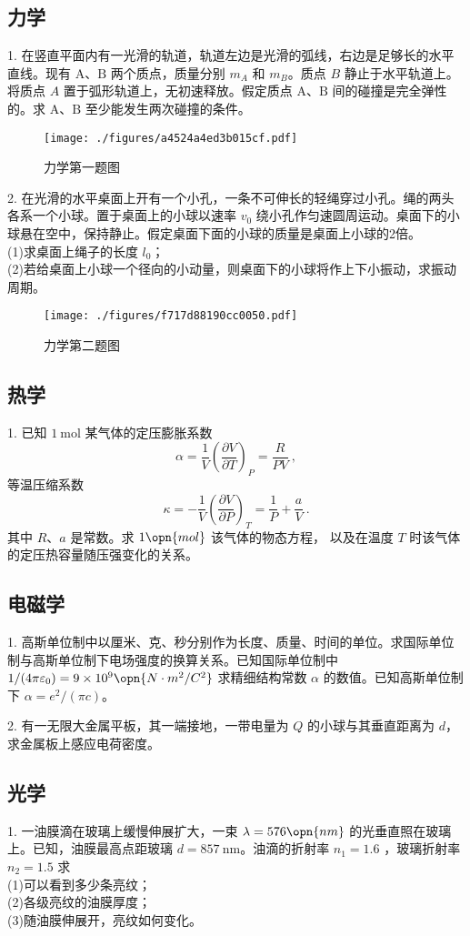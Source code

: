 \subsection{力学}
1. 在竖直平面内有一光滑的轨道，轨道左边是光滑的弧线，右边是足够长的水平直线。现有 $\mathrm{A}$、$\mathrm{B}$ 两个质点，质量分别 $m_{A}$ 和 $m_B$。质点 $B$ 静止于水平轨道上。将质点 $A$ 置于弧形轨道上，无初速释放。假定质点 $\mathrm{A}$、$\mathrm{B}$ 间的碰撞是完全弹性的。求 $\mathrm{A}$、$\mathrm{B}$ 至少能发生两次碰撞的条件。
\begin{figure}[ht]
\centering
\texttt{[image: ./figures/a4524a4ed3b015cf.pdf]}
\caption{力学第一题图} \label{fig_NJU18_1}
\end{figure}
2. 在光滑的水平桌面上开有一个小孔，一条不可伸长的轻绳穿过小孔。绳的两头各系一个小球。置于桌面上的小球以速率 $v_{0}$ 绕小孔作匀速圆周运动。桌面下的小球悬在空中，保持静止。假定桌面下面的小球的质量是桌面上小球的2倍。\\
(1)求桌面上绳子的长度 $l_{0}$；\\
(2)若给桌面上小球一个径向的小动量，则桌面下的小球将作上下小振动，求振动周期。
\begin{figure}[ht]
\centering
\texttt{[image: ./figures/f717d88190cc0050.pdf]}
\caption{力学第二题图} \label{fig_NJU18_2}
\end{figure}
\subsection{热学}
1. 已知 $1 \mathrm{~mol}$ 某气体的定压膨胀系数
\begin{equation}
\alpha=\frac{1}{V}\left(\frac{\partial V}{\partial T}\right)_{P}=\frac{R}{P V}~,
\end{equation}
等温压缩系数 
\begin{equation}
\kappa=-\frac{1}{V}\left(\frac{\partial V}{\partial P}\right)_{T}=\frac{1}{P}+\frac{a}{V}~.
\end{equation}
其中 $R$、$a$ 是常数。求 $1\opn{mol}$ 该气体的物态方程， 以及在温度 $T$ 时该气体的定压热容量随压强变化的关系。
\subsection{电磁学}
1. 高斯单位制中以厘米、克、秒分别作为长度、质量、时间的单位。求国际单位制与高斯单位制下电场强度的换算关系。已知国际单位制中 $1/(4 \pi \varepsilon_{0})=9 \times 10^{9} \opn{N \cdot m^{2}/C^{2}}$ 求精细结构常数 $\alpha$ 的数值。已知高斯单位制下 $\alpha=e^{2}/(\pi c)$。

2. 有一无限大金属平板，其一端接地，一带电量为 $Q$ 的小球与其垂直距离为 $d$，求金属板上感应电荷密度。
\subsection{光学}
1. 一油膜滴在玻璃上缓慢伸展扩大，一束 $\lambda=576 \opn{nm}$ 的光垂直照在玻璃上。已知，油膜最高点距玻璃 $d=857 \mathrm{~nm}$。油滴的折射率 $n_{1}=1.6$ ，玻璃折射率 $n_{2}=1.5$ 求\\
(1)可以看到多少条亮纹；\\
(2)各级亮纹的油膜厚度；\\
(3)随油膜伸展开，亮纹如何变化。
